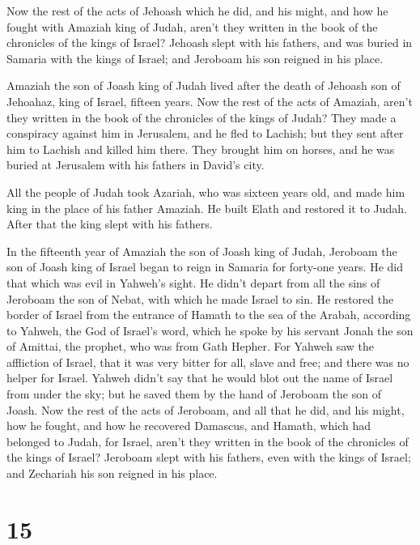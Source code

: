  Now the rest of the acts of Jehoash which he did, and his
might, and how he fought with Amaziah king of Judah, aren't they written
in the book of the chronicles of the kings of Israel? 
Jehoash slept with his fathers, and was buried in Samaria with the kings
of Israel; and Jeroboam his son reigned in his place.

 Amaziah the son of Joash king of Judah lived after the
death of Jehoash son of Jehoahaz, king of Israel, fifteen years.
 Now the rest of the acts of Amaziah, aren't they written
in the book of the chronicles of the kings of Judah?  They
made a conspiracy against him in Jerusalem, and he fled to Lachish; but
they sent after him to Lachish and killed him there.  They
brought him on horses, and he was buried at Jerusalem with his fathers
in David's city.

 All the people of Judah took Azariah, who was sixteen
years old, and made him king in the place of his father Amaziah.
 He built Elath and restored it to Judah. After that the
king slept with his fathers.

 In the fifteenth year of Amaziah the son of Joash king of
Judah, Jeroboam the son of Joash king of Israel began to reign in
Samaria for forty-one years.  He did that which was evil in
Yahweh's sight. He didn't depart from all the sins of Jeroboam the son
of Nebat, with which he made Israel to sin.  He restored
the border of Israel from the entrance of Hamath to the sea of the
Arabah, according to Yahweh, the God of Israel's word, which he spoke by
his servant Jonah the son of Amittai, the prophet, who was from Gath
Hepher.  For Yahweh saw the affliction of Israel, that it
was very bitter for all, slave and free; and there was no helper for
Israel.  Yahweh didn't say that he would blot out the name
of Israel from under the sky; but he saved them by the hand of Jeroboam
the son of Joash.  Now the rest of the acts of Jeroboam,
and all that he did, and his might, how he fought, and how he recovered
Damascus, and Hamath, which had belonged to Judah, for Israel, aren't
they written in the book of the chronicles of the kings of Israel?
 Jeroboam slept with his fathers, even with the kings of
Israel; and Zechariah his son reigned in his place.

\hypertarget{section-14}{%
\section{15}\label{section-14}}

